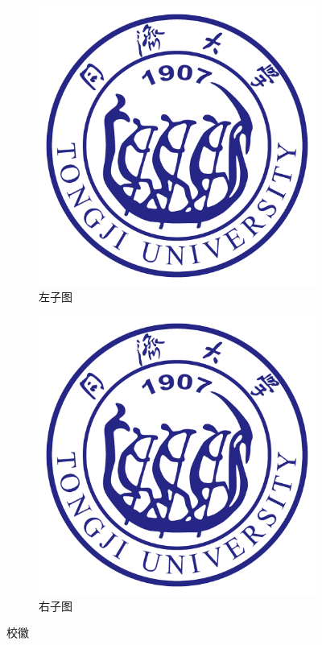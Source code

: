 \documentclass[12pt,hyperref,a4paper,UTF8]{ctexart}
\begin{document}
\begin{figure}[!htbp]
    \centering
    \begin{subfigure}[b]{0.47\textwidth}
        \includegraphics[width =\textwidth]{figures/tongji_logo_notitle.pdf}
        \caption{左子图}
        \label{left}
    \end{subfigure}
    \begin{subfigure}[b]{0.47\textwidth}
        \includegraphics[width =\textwidth]{figures/tongji_logo_notitle.pdf}
        \caption{右子图}
        \label{right}
    \end{subfigure}
    \caption{校徽}
    \label{Tongji_notitle}
\end{figure}
\end{document}
